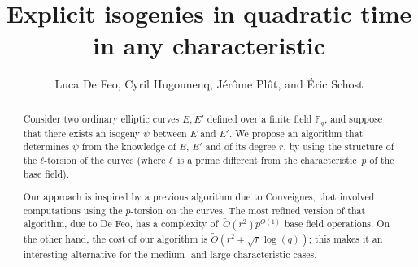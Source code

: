 \documentclass{lms}
\title[Explicit isogenies in any characteristic]{Explicit isogenies in quadratic time in any characteristic}
\author[L. De Feo, C. Hugounenq, J. Plût, É. Schost]%
  {Luca De Feo, Cyril Hugounenq, Jérôme Plût, and Éric Schost}
\newcommand{\F}{\mathbb{F}}
\newcommand{\tildO}{\tilde{O}}
\begin{document}
\maketitle

\begin{abstract}
  Consider two ordinary elliptic curves $E,E'$ defined over a finite field
  $\F_q$, and suppose that there exists an isogeny $\psi$ between $E$
  and $E'$.  We propose an algorithm that determines $\psi$ from the
  knowledge of $E$, $E'$ and of its degree $r$, by using the
  structure of the $ℓ$-torsion of the curves (where $ℓ$~is a prime
  different from the characteristic~$p$ of the base field).  

  Our approach is inspired by a previous algorithm due to Couveignes,
  that involved computations using the $p$-torsion on the curves. 
  The most refined version of that algorithm, due to De Feo, 
  has a complexity of~$\tildO(r^2) p^{O(1)}$ base field operations.
  On the other hand, the cost of our algorithm is $\tildO(r^2 + \sqrt{r} \log(q))$;
  this makes it an interesting alternative
  for the medium- and large-characteristic cases.
\end{abstract}



\end{document}
